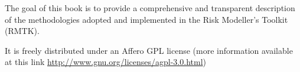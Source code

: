 The goal of this book is to provide a comprehensive and transparent description
of the methodologies adopted and implemented in the Risk Modeller's Toolkit
(RMTK).

It is freely distributed under an Affero GPL license 
(more information available at this link 
\href{http://www.gnu.org/licenses/agpl-3.0.html}{http://www.gnu.org/licenses/agpl-3.0.html})